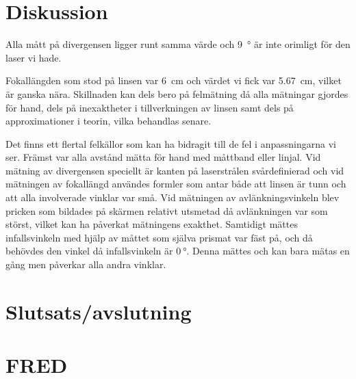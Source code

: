 \documentclass[a4paper]{article}
\begin{document}
\FloatBarrier

\section{Diskussion}
  
  Alla mått på divergensen ligger runt samma värde och \SI{9}{\degree} är inte orimligt för den laser vi hade.
  
  Fokallängden som stod på linsen var \SI{6}{\centi\meter} och värdet vi fick var \SI{5.67}{\centi\meter}, vilket är ganska nära. Skillnaden kan dels bero på felmätning då alla mätningar gjordes för hand, dels på inexaktheter i tillverkningen av linsen samt dels på approximationer i teorin, vilka behandlas senare.
  
  
  
  

  Det finns ett flertal felkällor som kan ha bidragit till de fel i anpassningarna vi ser. Främst var alla avstånd mätta för hand med måttband eller linjal. Vid mätning av divergensen speciellt är kanten på laserstrålen svårdefinierad och vid mätningen av fokallängd användes formler som antar både att linsen är tunn och att alla involverade vinklar var små. Vid mätningen av avlänkningsvinkeln blev pricken som bildades på skärmen relativt utsmetad då avlänkningen var som störst, vilket kan ha påverkat mätningens exakthet. Samtidigt mättes infallsvinkeln med hjälp av måttet som själva prismat var fäst på, och då behövdes den vinkel då infallsvinkeln är $\SI{0}{\degree}$. Denna mättes och kan bara mätas en gång men påverkar alla andra vinklar.
  

\section{Slutsats/avslutning}

\section{FRED}
\end{document}

